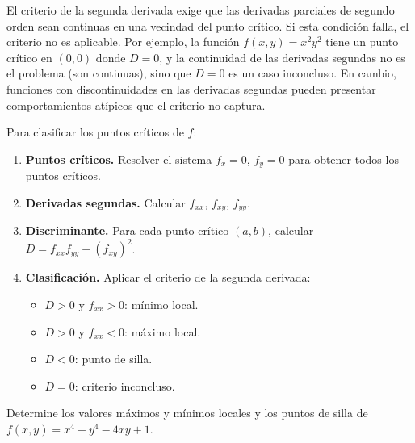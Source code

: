 \begin{rem}
El criterio de la segunda derivada exige que las derivadas parciales de
segundo orden sean continuas en una vecindad del punto crítico. Si esta
condición falla, el criterio no es aplicable. Por ejemplo, la función
$f(x,y) = x^2 y^2$ tiene un punto crítico en $(0,0)$ donde $D=0$, y la
continuidad de las derivadas segundas no es el problema (son continuas),
sino que $D=0$ es un caso inconcluso. En cambio, funciones con
discontinuidades en las derivadas segundas pueden presentar
comportamientos atípicos que el criterio no captura.
\end{rem}

\begin{pasos}
Para clasificar los puntos críticos de $f$:
\begin{enumerate}
    \item \textbf{Puntos críticos.} Resolver el sistema
    $f_x=0$, $f_y=0$ para obtener todos los puntos críticos.
    \item \textbf{Derivadas segundas.} Calcular $f_{xx}$, $f_{xy}$,
    $f_{yy}$.
    \item \textbf{Discriminante.} Para cada punto crítico $(a,b)$,
    calcular $D = f_{xx} f_{yy} - (f_{xy})^2$.
    \item \textbf{Clasificación.} Aplicar el criterio de la segunda
    derivada:
    \begin{itemize}
        \item $D>0$ y $f_{xx}>0$: mínimo local.
        \item $D>0$ y $f_{xx}<0$: máximo local.
        \item $D<0$: punto de silla.
        \item $D=0$: criterio inconcluso.
    \end{itemize}
\end{enumerate}
\end{pasos}

\begin{example}
Determine los valores máximos y mínimos locales y los puntos de silla de
$f(x,y) = x^4 + y^4 - 4xy + 1$.
\end{example}

